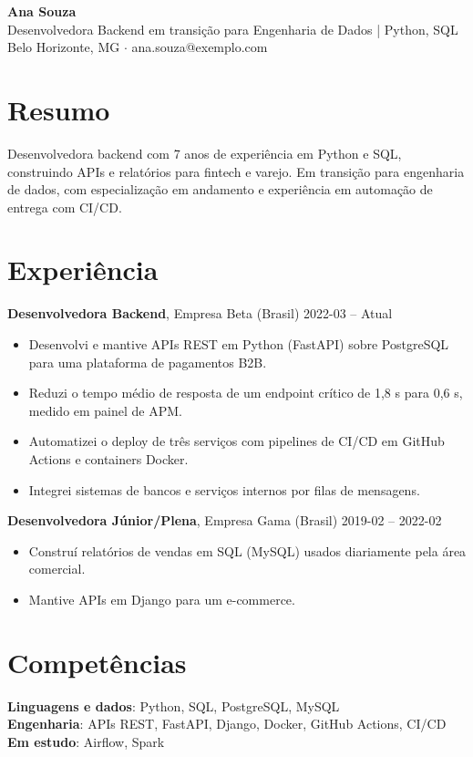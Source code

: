 \documentclass[10pt,a4paper]{article}
\begin{document}
{\LARGE\bfseries Ana Souza}\\[2pt]
{\large Desenvolvedora Backend em transição para Engenharia de Dados | Python, SQL}\\[2pt]
Belo Horizonte, MG $\cdot$ ana.souza@exemplo.com

\section*{Resumo}

Desenvolvedora backend com 7 anos de experiência em Python e SQL, construindo APIs e relatórios para fintech e varejo. Em transição para engenharia de dados, com especialização em andamento e experiência em automação de entrega com CI/CD.

\section*{Experiência}

\textbf{Desenvolvedora Backend}, Empresa Beta (Brasil) \hfill 2022-03 -- Atual\\
\begin{itemize}
  \item Desenvolvi e mantive APIs REST em Python (FastAPI) sobre PostgreSQL para uma plataforma de pagamentos B2B.
  \item Reduzi o tempo médio de resposta de um endpoint crítico de 1,8 s para 0,6 s, medido em painel de APM.
  \item Automatizei o deploy de três serviços com pipelines de CI/CD em GitHub Actions e containers Docker.
  \item Integrei sistemas de bancos e serviços internos por filas de mensagens.
\end{itemize}
\textbf{Desenvolvedora Júnior/Plena}, Empresa Gama (Brasil) \hfill 2019-02 -- 2022-02\\
\begin{itemize}
  \item Construí relatórios de vendas em SQL (MySQL) usados diariamente pela área comercial.
  \item Mantive APIs em Django para um e-commerce.
\end{itemize}

\section*{Competências}

\textbf{Linguagens e dados}: Python, SQL, PostgreSQL, MySQL\\
\textbf{Engenharia}: APIs REST, FastAPI, Django, Docker, GitHub Actions, CI/CD\\
\textbf{Em estudo}: Airflow, Spark\\
\end{document}
